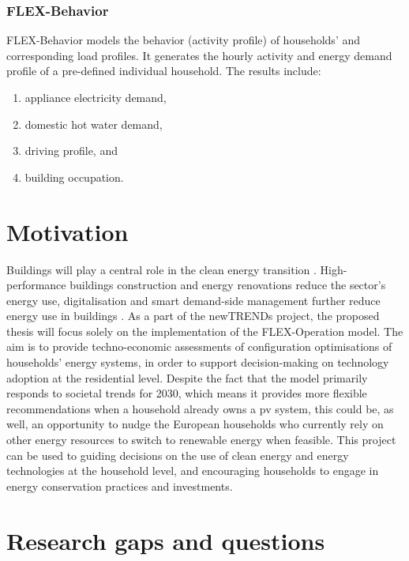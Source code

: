 \subsubsection{FLEX-Behavior}


FLEX-Behavior models the behavior (activity profile) of households' and corresponding load profiles. 
It generates the hourly activity and energy demand profile of a pre-defined individual household. 
The results include: 

\begin{enumerate}
  \item appliance electricity demand,
  \item domestic hot water demand,
  \item driving profile, and
  \item building occupation.
\end{enumerate}




\section{Motivation}




Buildings will play a central role in the clean energy transition \cite{building}.
High-performance buildings construction and energy renovations reduce the sector’s energy use, digitalisation and smart demand-side management further reduce energy use in buildings \cite{building}.  
As a part of the newTRENDs project, 
the proposed thesis will focus solely on 
the implementation of the FLEX-Operation model.  
The aim is to provide techno-economic assessments 
of configuration optimisations of households' energy systems, 
in order to support decision-making on technology adoption at the residential level. 
Despite the fact that the model primarily responds to societal trends for 2030, 
which means it provides more flexible recommendations when a household already owns a \gls{pv} system, 
this could be, as well, an opportunity to nudge the European households who currently rely on other energy resources
to switch to renewable energy when feasible. 
This project can be used to 
guiding decisions on the use of clean energy and energy technologies at the household level, 
and encouraging households to engage in energy conservation practices and investments. 


\section{Research gaps and questions}


